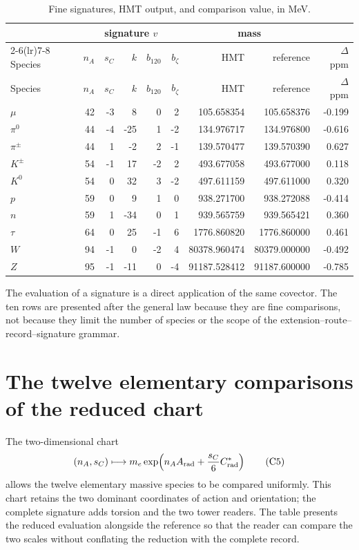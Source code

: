\begin{longtable}{@{}lrrrrrrrr@{}}
\caption{Fine signatures, HMT output, and comparison value, in MeV.}
\label{tab:diez-firmas-finas-rev6}\\
\toprule
&\multicolumn{5}{c}{signature \(v\)}&
\multicolumn{2}{c}{mass}&\\
\cmidrule(lr){2-6}\cmidrule(lr){7-8}
Species&\(n_A\)&\(s_C\)&\(k\)&\(b_{120}\)&\(b_{\zeta}\)&
{HMT}&{reference}&{\(\Delta\) ppm}\\
\midrule
\endfirsthead
\toprule
Species&\(n_A\)&\(s_C\)&\(k\)&\(b_{120}\)&\(b_{\zeta}\)&
{HMT}&{reference}&{\(\Delta\) ppm}\\
\midrule
\endhead
\(\mu\)&42&-3&8&0&2&105.658354&105.658376&-0.199\\
\(\pi^0\)&44&-4&-25&1&-2&134.976717&134.976800&-0.616\\
\(\pi^\pm\)&44&1&-2&2&-1&139.570477&139.570390&0.627\\
\(K^\pm\)&54&-1&17&-2&2&493.677058&493.677000&0.118\\
\(K^0\)&54&0&32&3&-2&497.611159&497.611000&0.320\\
\(p\)&59&0&9&1&0&938.271700&938.272088&-0.414\\
\(n\)&59&1&-34&0&1&939.565759&939.565421&0.360\\
\(\tau\)&64&0&25&-1&6&1776.860820&1776.860000&0.461\\
\(W\)&94&-1&0&-2&4&80378.960474&80379.000000&-0.492\\
\(Z\)&95&-1&-11&0&-4&91187.528412&91187.600000&-0.785\\
\bottomrule
\end{longtable}

The evaluation of a signature is a direct application of the same covector. The
ten rows are presented after the general law because they are fine
comparisons, not because they limit the number of species or the scope of the
extension--route--record--signature grammar.

\section{The twelve elementary comparisons of the reduced chart}

The two-dimensional chart
\[
(n_A,s_C)\longmapsto
m_e\exp\!\left(n_AA_{\rm rad}+\frac{s_C}{6}C^*_{\rm rad}\right)
\tag{C5}\label{eq:carta-reducida-doce-rev6}
\]
allows the twelve elementary massive species to be compared uniformly.
This chart retains the two dominant coordinates of action and orientation;
the complete signature adds torsion and the two tower readers. The table
presents the reduced evaluation alongside the reference so that the reader can
compare the two scales without conflating the reduction with the complete record.

